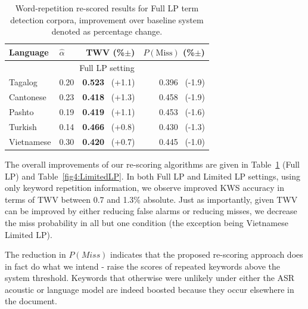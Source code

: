 \begin{table}
\centering
\begin{tabular}{l|l|r|r} \toprule
\bf Language & \bf $\widehat{\alpha}$ & \bf TWV (\%$\pm$) & \bf $P(\mathrm{Miss})$ (\%$\pm$) \\\midrule
\multicolumn{4}{c}{Full LP setting} \\\midrule
Tagalog & 0.20 & \textbf{0.523} $\,$ (+1.1) & 0.396 $\,$ (-1.9)\\
Cantonese & 0.23 & \textbf{0.418 }$\,$ (+1.3) & 0.458 $\,$ (-1.9) \\
Pashto & 0.19 & \textbf{0.419} $\,$ (+1.1) & 0.453 $\,$ (-1.6) \\
Turkish & 0.14 & \textbf{0.466} $\,$ (+0.8) & 0.430 $\,$ (-1.3) \\
Vietnamese & 0.30 & \textbf{0.420} $\,$ (+0.7) & 0.445 $\,$ (-1.0) \\
\bottomrule
\end{tabular}
\caption[Word-repetition re-scored results]{Word-repetition re-scored results for Full LP term detection corpora, improvement over baseline system denoted as percentage change. 
\label{fig4:FullLP} }
\end{table}


The overall improvements of our re-scoring algorithms are given in Table~\ref{fig4:FullLP} (Full LP) and Table~\ref{fig4:LimitedLP}.  In both Full LP and Limited LP settings, using only keyword repetition information, we observe improved KWS accuracy in terms of TWV between 0.7 and 1.3\% absolute.   Just as importantly, given TWV can be improved by either reducing false alarms or reducing misses, we decrease the miss probability in all but one condition (the exception being Vietnamese Limited LP).  

The reduction in $P(Miss)$ indicates that the proposed re-scoring approach does in fact do what we intend - raise the scores of repeated keywords above the system threshold.  Keywords that otherwise were unlikely under either the ASR acoustic or language model are indeed boosted because they occur elsewhere in the document.


